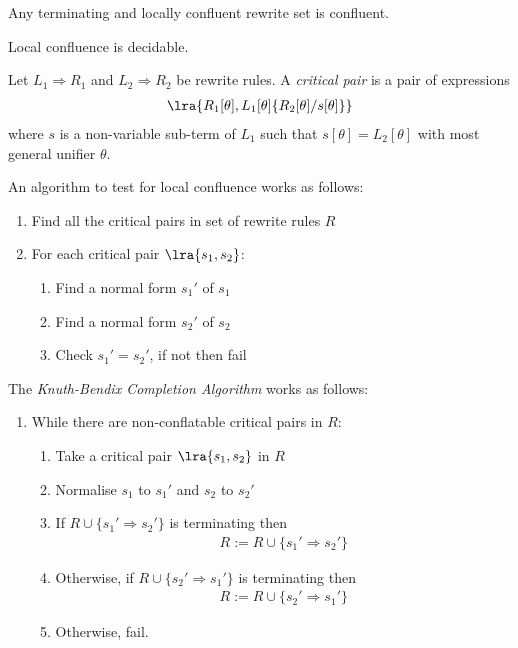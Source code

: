\documentclass{article}
\begin{document}
\begin{lemma}[Newman]
    Any terminating and locally confluent rewrite set is confluent. 
\end{lemma}

\begin{theorem}
    Local confluence is decidable.
\end{theorem}

\begin{definition}
    Let $L_1\Rightarrow R_1$ and $L_2\Rightarrow R_2$ be rewrite rules. A \emph{critical pair} is 
    a pair of expressions 
    \begin{align*}
        \lra{R_1[\theta], L_1[\theta]\{R_2[\theta]/s[\theta]\}}
    \end{align*}
    where $s$ is a non-variable sub-term of $L_1$ such that $s[\theta]=L_2[\theta]$ with 
    most general unifier $\theta$.
\end{definition}

\begin{theorem}
    An algorithm to test for local confluence works as follows:
    \begin{enumerate}
        \item Find all the critical pairs in set of rewrite rules $R$
        \item For each critical pair $\lra{s_1, s_2}$: \begin{enumerate}
            \item Find a normal form $s_1'$ of $s_1$
            \item Find a normal form $s_2'$ of $s_2$
            \item Check $s_1'=s_2'$, if not then fail
        \end{enumerate}
    \end{enumerate}
\end{theorem}

\begin{theorem}
    The \emph{Knuth-Bendix Completion Algorithm} works as follows:
    \begin{enumerate}
        \item While there are non-conflatable critical pairs in $R$: \begin{enumerate}
            \item Take a critical pair $\lra{s_1, s_2}$ in $R$
            \item Normalise $s_1$ to $s_1'$ and $s_2$ to $s_2'$
            \item If $R\cup\{s_1'\Rightarrow s_2'\}$ is terminating then \begin{align*}
                R := R \cup \{s_1'\Rightarrow s_2'\}
            \end{align*}
            \item Otherwise, if $R\cup\{s_2'\Rightarrow s_1'\}$ is terminating then \begin{align*}
                R := R \cup \{s_2' \Rightarrow s_1'\}
            \end{align*}
            \item Otherwise, fail.
        \end{enumerate}
    \end{enumerate}
\end{theorem}
\end{document}
